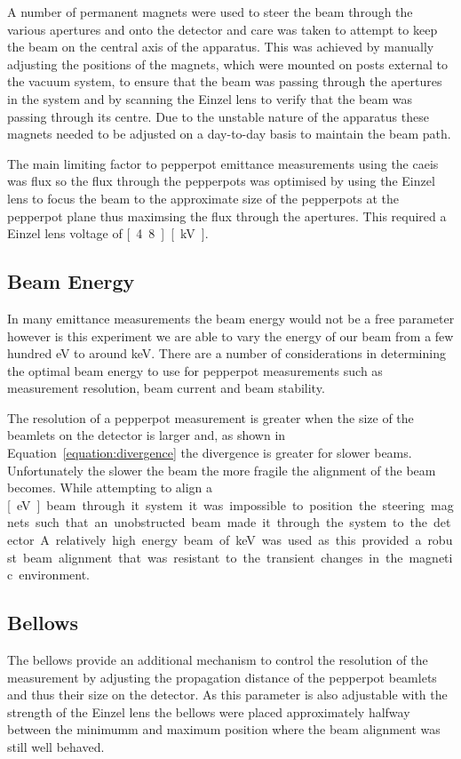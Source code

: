 A number of permanent magnets were used to steer the beam through the various apertures and onto the detector and care was taken to attempt to keep the beam on the central axis of the apparatus.
This was achieved by manually adjusting the positions of the magnets, which were mounted on posts external to the vacuum system, to ensure that the beam was passing through the apertures in the system and by scanning the Einzel lens to verify that the beam was passing through its centre.
Due to the unstable nature of the apparatus these magnets needed to be adjusted on a day-to-day basis to maintain the beam path.

The main limiting factor to pepperpot emittance measurements using the \gls{caeis} was flux so the flux through the pepperpots was optimised by using the Einzel lens to focus the beam to the approximate size of the pepperpots at the pepperpot plane thus maximsing the flux through the apertures.
This required a Einzel lens voltage of \unit[4.8][kV].

\subsection{Beam Energy}
In many emittance measurements the beam energy would not be a free parameter however is this experiment we are able to vary the energy of our beam from a few hundred eV to around \unit[10]{keV}.
There are a number of considerations in determining the optimal beam energy to use for pepperpot measurements such as measurement resolution, beam current and beam stability.

The resolution of a pepperpot measurement is greater when the size of the beamlets on the detector is larger and, as shown in Equation~\ref{equation:divergence} the divergence is greater for slower beams.
Unfortunately the slower the beam the more fragile the alignment of the beam becomes.
While attempting to align a \unit[500][eV] beam through it system it was impossible to position the steering magnets such that an unobstructed beam made it through the system to the detector.

A relatively high energy beam of \unit[8]{keV} was used as this provided a robust beam alignment that was resistant to the transient changes in the magnetic environment.

\subsection{Bellows}

The bellows provide an additional mechanism to control the resolution of the measurement by adjusting the propagation distance of the pepperpot beamlets and thus their size on the detector.
As this parameter is also adjustable with the strength of the Einzel lens the bellows were placed approximately halfway between the minimumm and maximum position where the beam alignment was still well behaved.

